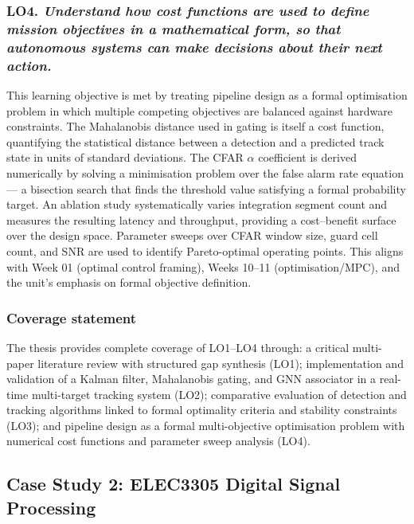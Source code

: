 \subsubsection*{LO4. \emph{Understand how cost functions are used to define mission
objectives in a mathematical form, so that autonomous systems can make decisions about
their next action.}}
This learning objective is met by treating pipeline design as a formal optimisation
problem in which multiple competing objectives are balanced against hardware constraints.
The Mahalanobis distance used in gating is itself a cost function, quantifying
the statistical distance between a detection and a predicted track state in units of
standard deviations. The CFAR $\alpha$ coefficient is derived numerically by solving a
minimisation problem over the false alarm rate equation --- a bisection search that
finds the threshold value satisfying a formal probability target. An ablation study
systematically varies integration segment count and measures the resulting latency and
throughput, providing a cost--benefit surface over the design space. Parameter sweeps
over CFAR window size, guard cell count, and SNR are used to identify Pareto-optimal
operating points. This aligns with Week 01 (optimal control framing), Weeks 10--11
(optimisation/MPC), and the unit's emphasis on formal objective definition.

\subsubsection*{Coverage statement}
The thesis provides complete coverage of LO1--LO4 through: a critical multi-paper
literature review with structured gap synthesis (LO1); implementation and validation of
a Kalman filter, Mahalanobis gating, and GNN associator in a real-time multi-target
tracking system (LO2); comparative evaluation of detection and tracking algorithms
linked to formal optimality criteria and stability constraints (LO3); and pipeline
design as a formal multi-objective optimisation problem with numerical cost functions and
parameter sweep analysis (LO4).

\subsection*{Case Study 2: ELEC3305 Digital Signal Processing}

